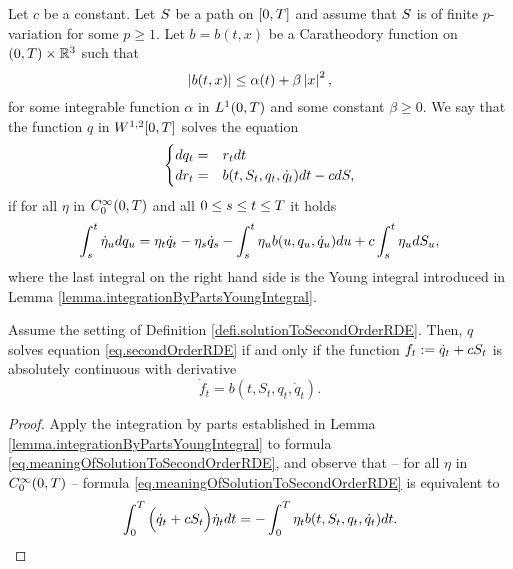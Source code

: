 \documentclass[10pt,a4paper]{article}
\begin{document}
\begin{appendices}
\begin{defi}\label{defi.solutionToSecondOrderRDE}
Let $c$ be a constant. Let $S$ be  a path on ${[0,T]}$ and assume that $S$ is of finite $p$-variation for some $p\geq 1$. Let $b=b(t,x)$ be a Caratheodory function on $(0,T)\times \mathbb{R}^{3}$ such that 
\begin{equation*}
\left\lvert {b(t,x)} \right\rvert \leq \alpha(t) + \beta \left\lvert {x} \right\rvert^{2},
\end{equation*}
for some integrable function $\alpha$ in $L^1(0,T)$ and some constant $\beta \geq 0$. We say that the function $q$ in $W^{1,2}{[0,T]}$ solves the equation
\begin{equation}\label{eq.secondOrderRDE}
\begin{cases}
dq_t =& r_t dt \\
dr_t = & b(t,S_t,q_t,\dot{q}_t) dt - c dS,
\end{cases}
\end{equation}
if for all $\eta$ in $C^{\infty}_{0}(0,T)$  and all $0\leq s\leq t \leq T$ it holds
\begin{equation}\label{eq.meaningOfSolutionToSecondOrderRDE}
\int_{s}^{t} \dot{\eta}_u dq_u = \eta_t \dot{q}_t - \eta_s \dot{q}_s - \int_{s}^{t} \eta_u b(u,q_u,\dot{q}_u) du + c\int_{s}^{t} \eta_u dS_u,
\end{equation}
where the last integral on the right hand side is the Young integral introduced in Lemma \ref{lemma.integrationByPartsYoungIntegral}. 
\end{defi}

\begin{lemma}\label{lemma.characterisationOfSolutionToSecondOrderRDE}
Assume the setting of Definition \ref{defi.solutionToSecondOrderRDE}. Then, $q$ solves equation \eqref{eq.secondOrderRDE} if and only if the function $f_t:= \dot{q}_t + cS_t$ is absolutely continuous with derivative 
\begin{equation*}
\dot{f}_t = b(t,S_t,q_t,\dot{q}_t).
\end{equation*}
\end{lemma}
\begin{proof}
Apply the integration by parts established in Lemma \ref{lemma.integrationByPartsYoungIntegral}  to formula \eqref{eq.meaningOfSolutionToSecondOrderRDE}, and observe  that -- for   all $\eta$ in $C^{\infty}_{0}(0,T)$ --  formula \eqref{eq.meaningOfSolutionToSecondOrderRDE} is equivalent to 
\begin{equation*}
\int_{0}^{T} \Big(\dot{q}_t + c S_t \Big)\dot{\eta}_t dt
 = - \int_{0}^{T} \eta_t b(t,S_t,q_t,\dot{q}_t) dt. 
\end{equation*}
\end{proof}


\end{appendices}
\end{document}
